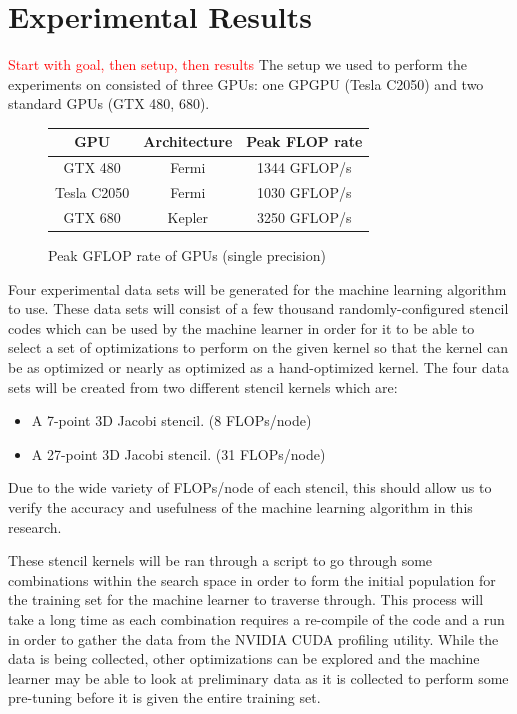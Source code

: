 \documentclass[conference]{IEEEtran}
\newcommand {\todo}[1] {\textcolor{red}{#1}}
\begin{document}
\section{Experimental Results}
\todo{Start with goal, then setup, then results}
	The setup we used to perform the experiments on consisted of three GPUs: one GPGPU (Tesla C2050) and two standard GPUs (GTX 480, 680). 
\begin{figure}[h]
	\begin{center}
		\begin{tabular}
		{|c|c|c|}
			\hline
			GPU & Architecture & Peak FLOP rate\\
			\hline
			GTX 480 & Fermi & 1344 GFLOP/s\\
			Tesla C2050 & Fermi & 1030 GFLOP/s\\
			GTX 680 & Kepler & 3250 GFLOP/s\\
			\hline
		\end{tabular}
	\end{center}
	\caption{Peak GFLOP rate of GPUs (single precision)}
\end{figure}

	Four experimental data sets will be generated for the machine learning algorithm to use. These data sets will consist of a few thousand randomly-configured stencil codes which can be used by the machine learner in order for it to be able to select a set of optimizations to perform on the given kernel so that the kernel can be as optimized or nearly as optimized as a hand-optimized kernel. The four data sets will be created from two different stencil kernels which are:
	
\begin{itemize}
	\item A 7-point 3D Jacobi stencil. (8 FLOPs/node)
	\item A 27-point 3D Jacobi stencil. (31 FLOPs/node)
\end{itemize}

	Due to the wide variety of FLOPs/node of each stencil, this should allow us to verify the accuracy and usefulness of the machine learning algorithm in this research.

	These stencil kernels will be ran through a script to go through some combinations within the search space in order to form the initial population for the training set for the machine learner to traverse through. This process will take a long time as each combination requires a re-compile of the code and a run in order to gather the data from the NVIDIA CUDA profiling utility. While the data is being collected, other optimizations can be explored and the machine learner may be able to look at preliminary data as it is collected to perform some pre-tuning before it is given the entire training set.
\end{document}
